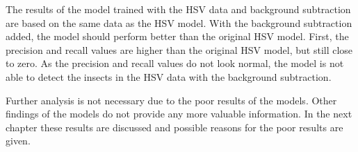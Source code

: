 The results of the model trained with the HSV data and background subtraction are based on the same data as the HSV model. With the background subtraction added, the model should perform better than the original HSV model. First, the precision and recall values are higher than the original HSV model, but still close to zero. As the precision and recall values do not look normal, the model is not able to detect the insects in the HSV data with the background subtraction.

Further analysis is not necessary due to the poor results of the models. Other findings of the models do not provide any more valuable information. In the next chapter these results are discussed and possible reasons for the poor results are given.
